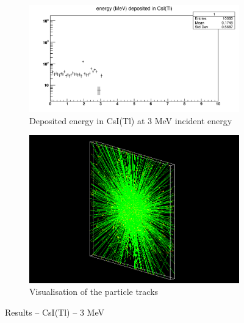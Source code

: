 \documentclass{article}
\begin{document}
\begin{figure}[H]
\centering
\begin{subfigure}{.5\textwidth}
  \centering
  \includegraphics[width=\linewidth]{images/task1/CsI_3MeV.png}
  \caption{Deposited energy in CsI(Tl) at 3 MeV incident energy}
\end{subfigure}%
\begin{subfigure}{.5\textwidth}
  \centering
  \includegraphics[width=\linewidth]{images/task1/CsI_3MeV_10000.png}
  \caption{Visualisation of the particle tracks}
\end{subfigure}
\caption{Results – CsI(Tl) – 3 MeV}
\end{figure}
\end{document}
